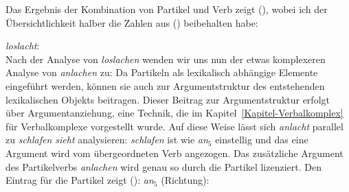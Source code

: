 Das Ergebnis der Kombination von Partikel und Verb zeigt (), wobei ich der Übersichtlichkeit
halber die Zahlen aus () beibehalten habe:

\eas
\label{le-loslacht}%
\emph{loslacht}:\\
\zs
Nach der Analyse von \emph{loslachen} wenden wir uns nun der etwas komplexeren Analyse von
\emph{anlachen} zu: Da Partikeln als lexikalisch abhängige Elemente eingeführt werden, 
können sie auch zur Argumentstruktur des entstehenden lexikalischen Objekts
beitragen. Dieser Beitrag zur Argumentstruktur erfolgt über Argumentanziehung,
eine Technik, die im Kapitel~\ref{Kapitel-Verbalkomplex} für Verbalkomplexe vorgestellt
wurde. Auf diese Weise lässt sich \emph{anlacht} parallel zu \emph{schlafen sieht}
analysieren: \emph{schlafen} ist wie \emph{an$_5$} einstellig und das eine Argument wird vom
übergeordneten Verb angezogen. Das zusätzliche Argument des Partikelverbs \emph{anlachen} wird genau
so durch die Partikel lizenziert. Den Eintrag für die Partikel zeigt ():
\eas
\label{le-an5}%
\emph{an$_5$} (Richtung):\\
\zs
\largerpage[-1]

